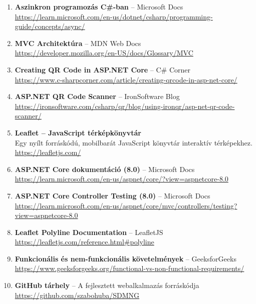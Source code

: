 \begin{enumerate}
    \item \label{ref:async_programozas} \textbf{Aszinkron programozás C\#-ban} – Microsoft Docs\\
    \url{https://learn.microsoft.com/en-us/dotnet/csharp/programming-guide/concepts/async/}

    \item \label{ref:mvc_architektura} \textbf{MVC Architektúra} – MDN Web Docs\\
    \url{https://developer.mozilla.org/en-US/docs/Glossary/MVC}

    \item \label{ref:qr_code} \textbf{Creating QR Code in ASP.NET Core} – C\# Corner\\
    \url{https://www.c-sharpcorner.com/article/creating-qrcode-in-asp-net-core/}

    \item \label{ref:qr_scanner} \textbf{ASP.NET QR Code Scanner} – IronSoftware Blog\\
    \url{https://ironsoftware.com/csharp/qr/blog/using-ironqr/asp-net-qr-code-scanner/}

    \item \label{ref:leaflet} \textbf{Leaflet – JavaScript térképkönyvtár}\\
    Egy nyílt forráskódú, mobilbarát JavaScript könyvtár interaktív térképekhez.\\
    \url{https://leafletjs.com/}

    \item \label{ref:aspnet_core_docs} \textbf{ASP.NET Core dokumentáció (8.0)} – Microsoft Docs\\
    \url{https://learn.microsoft.com/en-us/aspnet/core/?view=aspnetcore-8.0}

    \item \label{ref:controller_testing} \textbf{ASP.NET Core Controller Testing (8.0)} – Microsoft Docs\\
    \url{https://learn.microsoft.com/en-us/aspnet/core/mvc/controllers/testing?view=aspnetcore-8.0}
    
    \item \label{ref:leaflet_polyline_docs} \textbf{Leaflet Polyline Documentation} – LeafletJS\\
    \url{https://leafletjs.com/reference.html#polyline}
    
    \item \label{ref:func_vs_nonfunc} \textbf{Funkcionális és nem-funkcionális követelmények} – GeeksforGeeks\\
    \url{https://www.geeksforgeeks.org/functional-vs-non-functional-requirements/}

    \item \label{ref:github_repo} \textbf{GitHub tárhely} – A fejlesztett webalkalmazás forráskódja\\
    \url{https://github.com/szabohuba/SDMNG}

    

\end{enumerate}
